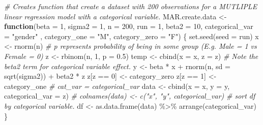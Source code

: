 \documentclass[
]{article}
\newenvironment{Shaded}{\begin{snugshade}}{\end{snugshade}}
\newcommand{\AttributeTok}[1]{\textcolor[rgb]{0.77,0.63,0.00}{#1}}
\newcommand{\CommentTok}[1]{\textcolor[rgb]{0.56,0.35,0.01}{\textit{#1}}}
\newcommand{\ControlFlowTok}[1]{\textcolor[rgb]{0.13,0.29,0.53}{\textbf{#1}}}
\newcommand{\DecValTok}[1]{\textcolor[rgb]{0.00,0.00,0.81}{#1}}
\newcommand{\FloatTok}[1]{\textcolor[rgb]{0.00,0.00,0.81}{#1}}
\newcommand{\FunctionTok}[1]{\textcolor[rgb]{0.00,0.00,0.00}{#1}}
\newcommand{\NormalTok}[1]{#1}
\newcommand{\OtherTok}[1]{\textcolor[rgb]{0.56,0.35,0.01}{#1}}
\newcommand{\SpecialCharTok}[1]{\textcolor[rgb]{0.00,0.00,0.00}{#1}}
\newcommand{\StringTok}[1]{\textcolor[rgb]{0.31,0.60,0.02}{#1}}
\begin{document}
\begin{Shaded}
\begin{Highlighting}[]
\CommentTok{\# Creates function that create a dataset with 200 observations for a MUTLIPLE linear regression model with a categorical variable.  }
\NormalTok{MAR.create.data }\OtherTok{\textless{}{-}} \ControlFlowTok{function}\NormalTok{(}\AttributeTok{beta =} \DecValTok{1}\NormalTok{, }\AttributeTok{sigma2 =} \DecValTok{1}\NormalTok{, }\AttributeTok{n =} \DecValTok{200}\NormalTok{,}
                        \AttributeTok{run =} \DecValTok{1}\NormalTok{, }\AttributeTok{beta2 =} \DecValTok{10}\NormalTok{, }\AttributeTok{categorical\_var =} \StringTok{"gender"}\NormalTok{ , }\AttributeTok{category\_one =} \StringTok{"M"}\NormalTok{, }\AttributeTok{category\_zero =} \StringTok{"F"}\NormalTok{) \{}
  \FunctionTok{set.seed}\NormalTok{(}\AttributeTok{seed =}\NormalTok{ run)}
\NormalTok{  x }\OtherTok{\textless{}{-}} \FunctionTok{rnorm}\NormalTok{(n)}
  \CommentTok{\# p represents probability of being in some group (E.g. Male = 1 vs Female = 0)}
\NormalTok{  z }\OtherTok{\textless{}{-}} \FunctionTok{rbinom}\NormalTok{(n, }\DecValTok{1}\NormalTok{, }\AttributeTok{p =} \FloatTok{0.5}\NormalTok{)}
\NormalTok{  temp }\OtherTok{\textless{}{-}} \FunctionTok{cbind}\NormalTok{(}\AttributeTok{x =}\NormalTok{ x, }\AttributeTok{z =}\NormalTok{ z)}
  \CommentTok{\# Note the beta2 term for categorical variable effect.}
\NormalTok{  y }\OtherTok{\textless{}{-}}\NormalTok{ beta }\SpecialCharTok{*}\NormalTok{ x }\SpecialCharTok{+} \FunctionTok{rnorm}\NormalTok{(n, }\AttributeTok{sd =} \FunctionTok{sqrt}\NormalTok{(sigma2)) }\SpecialCharTok{+}\NormalTok{ beta2 }\SpecialCharTok{*}\NormalTok{ z}
\NormalTok{  z[z }\SpecialCharTok{==} \DecValTok{0}\NormalTok{] }\OtherTok{\textless{}{-}}\NormalTok{ category\_zero}
\NormalTok{  z[z }\SpecialCharTok{==} \DecValTok{1}\NormalTok{] }\OtherTok{\textless{}{-}}\NormalTok{ category\_one}
  \CommentTok{\# cat\_var = categorical\_var}
\NormalTok{  data }\OtherTok{\textless{}{-}} \FunctionTok{cbind}\NormalTok{(}\AttributeTok{x =}\NormalTok{ x, }\AttributeTok{y =}\NormalTok{ y, }\AttributeTok{categorical\_var =}\NormalTok{ z)}
  \CommentTok{\# colnames(data) \textless{}{-} c("x", "y", categorical\_var)}
  \CommentTok{\# sort df by categorical variable.}
\NormalTok{  df }\OtherTok{\textless{}{-}} \FunctionTok{as.data.frame}\NormalTok{(data) }\SpecialCharTok{\%\textgreater{}\%} 
    \FunctionTok{arrange}\NormalTok{(categorical\_var)}
\NormalTok{\}}
\end{Highlighting}
\end{Shaded}
\end{document}
